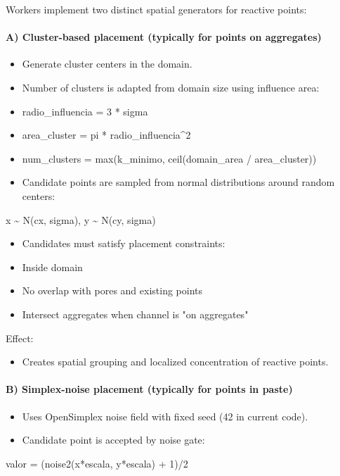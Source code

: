 ﻿\documentclass[11pt,a4paper]{article}
\begin{document}
Workers implement two distinct spatial generators for reactive points:


\paragraph{A) Cluster-based placement (typically for points on aggregates)}

\begin{itemize}
\item Generate cluster centers in the domain.
\item Number of clusters is adapted from domain size using influence area:
\item radio\_influencia = 3 * sigma
\item area\_cluster = pi * radio\_influencia\textasciicircum{}2
\item num\_clusters = max(k\_minimo, ceil(domain\_area / area\_cluster))
\item Candidate points are sampled from normal distributions around random centers:
\end{itemize}
x \textasciitilde{} N(cx, sigma), y \textasciitilde{} N(cy, sigma)

\begin{itemize}
\item Candidates must satisfy placement constraints:
\item Inside domain
\item No overlap with pores and existing points
\item Intersect aggregates when channel is "on aggregates"
\end{itemize}

Effect:

\begin{itemize}
\item Creates spatial grouping and localized concentration of reactive points.
\end{itemize}

\paragraph{B) Simplex-noise placement (typically for points in paste)}

\begin{itemize}
\item Uses OpenSimplex noise field with fixed seed (42 in current code).
\item Candidate point is accepted by noise gate:
\end{itemize}
valor = (noise2(x*escala, y*escala) + 1)/2
\end{document}
